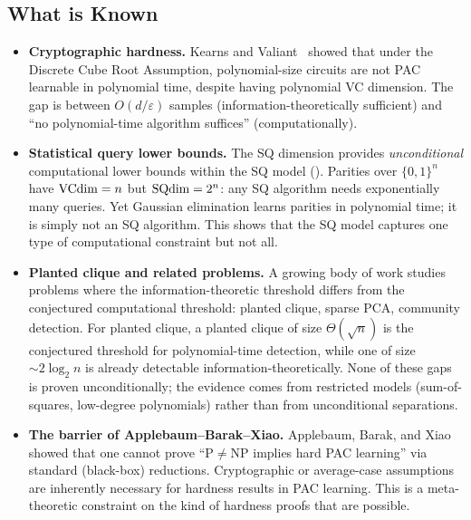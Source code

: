 \subsection{What is Known}

\begin{itemize}[leftmargin=*]
\item \textbf{Cryptographic hardness.}  Kearns and
  Valiant~\cite{KearnsValiant1994} showed that under the Discrete Cube Root
  Assumption, polynomial-size circuits are not PAC learnable in polynomial
  time, despite having polynomial VC dimension.  The gap is between
  $O(d/\varepsilon)$ samples (information-theoretically sufficient) and
  ``no polynomial-time algorithm suffices'' (computationally).

\item \textbf{Statistical query lower bounds.}  The SQ dimension provides
  \emph{unconditional} computational lower bounds within the SQ model
  ().  Parities over $\{0,1\}^n$ have
  $\mathrm{VCdim} = n$ but $\mathrm{SQdim} = 2^n$: any SQ algorithm needs exponentially
  many queries.  Yet Gaussian elimination learns parities in polynomial
  time; it is simply not an SQ algorithm.  This shows that the SQ model
  captures one type of computational constraint but not all.

\item \textbf{Planted clique and related problems.}  A growing body of work
  studies problems where the information-theoretic threshold differs from the
  conjectured computational threshold: planted clique, sparse PCA, community
  detection.  For planted clique, a planted clique of size $\Theta(\sqrt{n})$
  is the conjectured threshold for polynomial-time detection, while one of
  size $\sim 2\log_2 n$ is already detectable information-theoretically.  None
  of these gaps is proven unconditionally; the evidence comes from restricted
  models (sum-of-squares, low-degree polynomials) rather than from
  unconditional separations.

\item \textbf{The barrier of Applebaum--Barak--Xiao.}  Applebaum, Barak, and
  Xiao~\cite{ApplebaumBarakXiao2008} showed that one cannot prove
  ``$\mathrm{P} \neq \mathrm{NP}$ implies hard PAC learning'' via standard
  (black-box) reductions.  Cryptographic or average-case assumptions are
  inherently necessary for hardness results in PAC learning.  This is a
  meta-theoretic constraint on the kind of hardness proofs that are possible.
\end{itemize}

